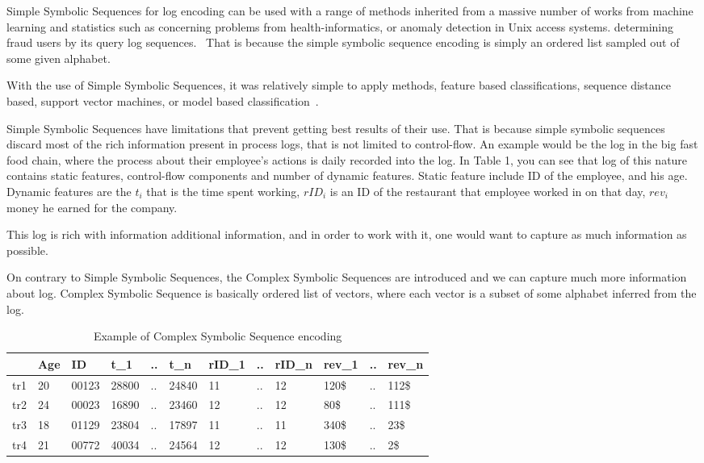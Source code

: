 Simple Symbolic Sequences for log encoding can be used with a range of methods inherited from a massive number of works from machine learning and statistics such as concerning problems from health-informatics, or anomaly detection in Unix access systems. determining fraud users by its query log sequences.~\cite{Xing:2010:BSS:1882471.1882478} That is because the simple symbolic sequence encoding is simply an ordered list sampled out of some given alphabet. 

With the use of Simple Symbolic Sequences, it was relatively simple to apply methods, feature based classifications, sequence distance based, support vector machines, or model based classification~\cite{Xing:2010:BSS:1882471.1882478}.

Simple Symbolic Sequences have limitations that prevent getting best results of their use.
That is because simple symbolic sequences discard most of the rich information present in process logs, that is not limited to control-flow. An example would be the log in the big fast food chain, where the process about their employee's actions is daily recorded into the log. In Table 1, you can see that log of this nature contains static features, control-flow components and number of dynamic features. Static feature include ID of the employee, and his age. Dynamic features are the $t_i$ that is the time spent working, $rID_i$ is an ID of the restaurant that employee worked in on that day, $rev_i$ money he earned for the company. 

This log is rich with information additional information, and in order to work with it, one would want to capture as much information as possible.

On contrary to Simple Symbolic Sequences, the Complex Symbolic Sequences are introduced and we can capture much more information about log. Complex Symbolic Sequence is basically ordered list of vectors, where each vector is a subset of some alphabet inferred from the log.

\begin{table}[h]
	\centering
	\begin{tabular}{| l | l | l | l | l | l | l | l | l | l | l | l |}
		\hline
		& Age & ID & t\_1 & .. & t\_n & rID\_1 & .. & rID\_n & rev\_1 & .. & rev\_n \\	
		\hline
		tr1 & 20 & 00123 & 28800 & .. & 24840 & 11 & .. & 12 & 120\$ & .. & 112\$ \\
		tr2 & 24 & 00023 & 16890 & .. & 23460 & 12 & .. & 12 & 80\$ & .. & 111\$ \\
		tr3 & 18 & 01129 & 23804 & .. & 17897 & 11 & .. & 11 & 340\$ & .. & 23\$ \\
		tr4 & 21 & 00772 & 40034 & .. & 24564 & 12 & .. & 12 & 130\$ & .. & 2\$ \\
		\hline
		
	\end{tabular}
	\caption{Example of Complex Symbolic Sequence encoding}
	\label{tab:statements}
\end{table}




